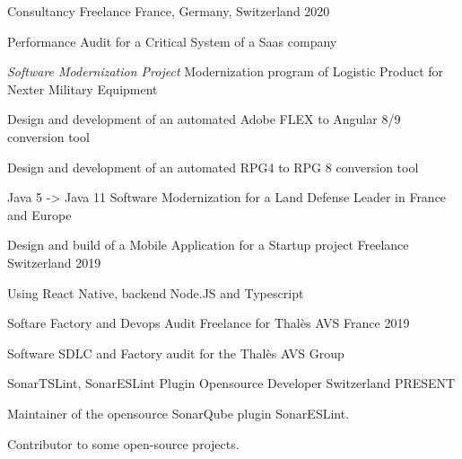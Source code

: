 

\begin{cventries}
\cventry
{Consultancy} %
{Freelance} %
{France, Germany, Switzerland} %
{2020} %
{
  \begin{cvitems} %
    \item{Performance Audit for a Critical System of a Saas company}
    \item{\emph{Software Modernization Project} Modernization program of Logistic Product for Nexter Military Equipment}
    \item{Design and development of an automated Adobe FLEX to Angular 8/9 conversion tool}
    \item{Design and development of an automated RPG4 to RPG 8 conversion tool}
    \item{Java 5 -> Java 11 Software Modernization for a Land Defense Leader in France and Europe}
  \end{cvitems}
}


\cventry
{Design and build of a Mobile Application for a Startup project} %
{Freelance} %
{Switzerland} %
{2019} %
{
  \begin{cvitems} %
  \item {Using React Native, backend Node.JS and Typescript}
  \end{cvitems}
}

\cventry
{Softare Factory and Devops Audit} %
{Freelance for Thalès AVS} %
{France} %
{2019} %
{
  \begin{cvitems} %
  \item {Software SDLC and Factory audit for the Thalès AVS Group}
  \end{cvitems}
}

  \cventry
    {SonarTSLint, SonarESLint Plugin} %
    {Opensource Developer} %
    {Switzerland} %
    {PRESENT} %
    {
      \begin{cvitems} %
        \item {Maintainer of the opensource SonarQube plugin SonarESLint.}
		\item {Contributor to some open-source projects.}
      \end{cvitems}
    }


\end{cventries}
